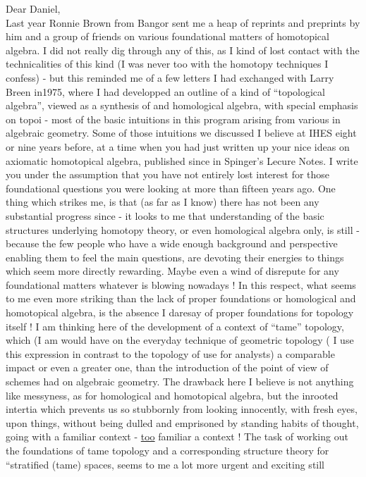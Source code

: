 \noindent Dear Daniel,\\
Last year Ronnie Brown from Bangor sent me a heap of reprints and preprints by him and a group of friends\handwritten{,} on various foundational matters of homotopical algebra. I did not really dig through any of this, as I kind of lost contact with the technicalities of this kind (I was never too  with the homotopy techniques  I confess) - but this reminded me of a few letters I had exchanged with Larry Breen in1975, where I had developped an outline of a  kind of ``topological algebra'', viewed as a synthesis of  and homological algebra, with special emphasis on topoi - most of the basic intuitions in this program arising from various  in algebraic geometry. \deleted{(}Some of those intuitions we discussed\handwritten{,} I believe\handwritten{,} at IHES eight or nine years before, at a time when you had just written up your nice ideas on axiomatic homotopical algebra, published since in Spinger's Lecure Notes. I write you under the assumption that you have not entirely lost interest for those foundational questions you were looking at more than fifteen years ago. One thing which strikes me, is that (as far as I know) there has not been any substantial progress since - it looks to me that  understanding of the basic structures underlying homotopy theory, or even homological algebra only, is still  -  because the few people who have a wide enough background and perspective enabling them to feel the main questions, are devoting their energies to things which seem more directly rewarding. Maybe  even a wind of disrepute for any foundational matters whatever is blowing nowadays ! In this respect, what seems to me even more striking than the lack of proper foundations or homological and homotopical algebra, is the absence I dare\unsure{-}say\unsure{,} of proper foundations for topology itself ! I am thinking here  of the development of a context of ``tame'' topology, which (I am  would have on the everyday technique of geometric topology ( I use this expression in contrast to the topology of use for analysts) a comparable impact or even a greater one, than the introduction of the point of view of schemes had on algebraic geometry. The  drawback here I believe is not anything like messyness, as for homological and homotopical algebra, but  the inrooted intertia which  prevents  us so stubbornly from looking innocently, with fresh eyes, upon things, without being dulled and emprisoned by standing habits of thought, going with a familiar context - \uline{too} familiar a context ! The task of working out the foundations of tame topology\handwritten{,} and a  corresponding structure theory for ``stratified (tame) spaces, seems to me a lot more urgent and exciting still 
